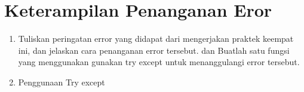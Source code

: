 \section{Keterampilan Penanganan Eror}
\begin{enumerate}
	\item Tuliskan  peringatan  error  yang  didapat  dari  mengerjakan  praktek  keempat  ini, dan  jelaskan  cara  penanganan  error  tersebut.   dan  Buatlah  satu  fungsi  yang menggunakan gunakan try except untuk menanggulangi error tersebut.
	

	\item Penggunaan Try except
	
\end{enumerate}


	
	

    
    
